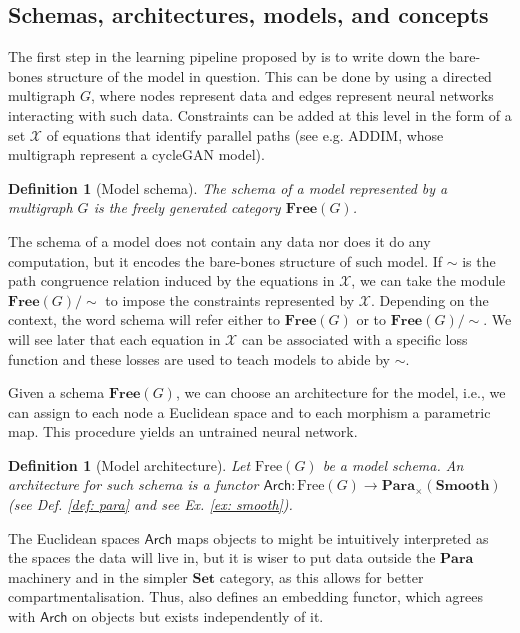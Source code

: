 \documentclass[11pt,a4paper,openright,twoside]{report}
\theoremstyle{plain}
\newtheorem{definition}[proposition]{Definition}
\theoremstyle{definition}
\begin{document}
\subsection{Schemas, architectures, models, and concepts}

The first step in the learning pipeline proposed by \cite{gavranovic2019compositional} is to write down the bare-bones structure of the model in question. This can be done by using a directed multigraph $G$, where nodes represent data and edges represent neural networks interacting with such data. Constraints can be added at this level in the form of a set $\mathcal{X}$ of equations that identify parallel paths (see e.g. ADDIM, whose multigraph represent a cycleGAN model). 

\begin{definition}[Model schema]
  The schema of a model represented by a multigraph $G$ is the freely generated category $\mathbf{Free}(G)$.
\end{definition}

The schema of a model does not contain any data nor does it do any computation, but it encodes the bare-bones structure of such model. If ${\sim}$ is the path congruence relation induced by the equations in $\mathcal{X}$, we can take the module $\mathbf{Free}(G)/{\sim}$ to impose the constraints represented by $\mathcal{X}$. Depending on the context, the word schema will refer either to $\mathbf{Free}(G)$ or to $\mathbf{Free}(G)/{\sim}$. We will see later that each equation in $\mathcal{X}$ can be associated with a specific loss function and these losses are used to teach models to abide by ${\sim}$.

Given a schema $\mathbf{Free}(G)$, we can choose an architecture for the model, i.e., we can assign to each node a Euclidean space and to each morphism a parametric map. This procedure yields an untrained neural network.

\begin{definition}[Model architecture]
  Let $\mathrm{Free}(G)$ be a model schema. An architecture for such schema is a functor $\mathsf{Arch}: \mathrm{Free}(G) \to \mathbf{Para}_{\times}(\mathbf{Smooth})$ (see \textit{Def. \ref{def: para}} and see \textit{Ex. \ref{ex: smooth}}).
\end{definition}

The Euclidean spaces $\mathsf{Arch}$ maps objects to might be intuitively interpreted as the spaces the data will live in, but it is wiser to put data outside the $\mathbf{Para}$ machinery and in the simpler $\mathbf{Set}$ category, as this allows for better compartmentalisation. Thus, \cite{gavranovic2019compositional} also defines an embedding functor, which agrees with $\mathsf{Arch}$ on objects but exists independently of it.
\end{document}
